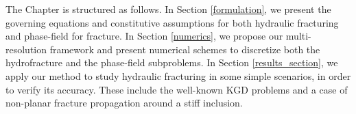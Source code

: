 The Chapter is structured as follows. In Section \ref{formulation}, we present the governing equations and constitutive assumptions for both hydraulic fracturing and phase-field for fracture. In Section \ref{numerics}, we propose our multi-resolution framework and present numerical schemes to discretize both the hydrofracture and the phase-field subproblems. In Section \ref{results_section}, we apply our method to study hydraulic fracturing in some simple scenarios, in order to verify its accuracy. These include the well-known KGD\cite{geertsma1969rapid, zheltov19553} problems and a case of non-planar fracture propagation around a stiff inclusion. 

